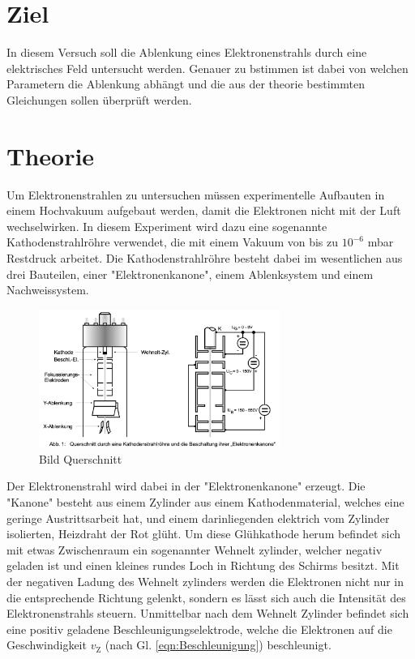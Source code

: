 \section{Ziel}
In diesem Versuch soll die Ablenkung eines Elektronenstrahls durch eine elektrisches Feld untersucht werden.
Genauer zu bstimmen ist dabei von welchen Parametern die Ablenkung abhängt und die aus der theorie bestimmten Gleichungen sollen überprüft werden.
\section{Theorie}
\label{sec:Theorie}
Um Elektronenstrahlen zu untersuchen müssen experimentelle Aufbauten in einem Hochvakuum aufgebaut werden, damit die Elektronen nicht mit der Luft wechselwirken.
In diesem Experiment wird dazu eine sogenannte Kathodenstrahlröhre verwendet, die mit einem Vakuum von bis zu $10^{-6}$ mbar Restdruck arbeitet.
Die Kathodenstrahlröhre besteht dabei im wesentlichen aus drei Bauteilen, einer "Elektronenkanone", einem Ablenksystem und einem Nachweissystem.
\begin{figure}[H]
    \centering
    \includegraphics[width=0.7\textwidth]{bilder/Querschnitt_Roehre.png}
    \caption{Bild Querschnitt}
    \label{fig:Querschnitt}
\end{figure}
Der Elektronenstrahl wird dabei in der "Elektronenkanone" erzeugt. 
Die "Kanone" besteht aus einem Zylinder aus einem Kathodenmaterial, welches eine geringe Austrittsarbeit hat,
und einem darinliegenden elektrich vom Zylinder isolierten, Heizdraht der Rot glüht.
Um diese Glühkathode herum befindet sich mit etwas Zwischenraum ein sogenannter Wehnelt zylinder, welcher negativ geladen ist und einen kleines rundes Loch in Richtung des Schirms besitzt.
Mit der negativen Ladung des Wehnelt zylinders werden die Elektronen nicht nur in die entsprechende Richtung gelenkt, sondern es lässt sich auch die Intensität des Elektronenstrahls steuern.
Unmittelbar nach dem Wehnelt Zylinder befindet sich eine positiv geladene Beschleunigungselektrode, welche die Elektronen auf die Geschwindigkeit $v_{\text{Z}}$ (nach Gl. \ref{eqn:Beschleunigung}) beschleunigt.
